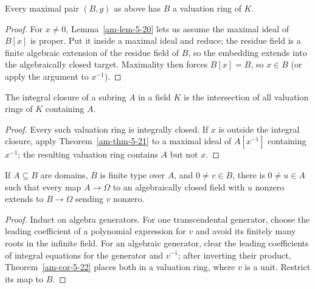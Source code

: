 \begin{theorem}
\label{am-thm-5-21}
\uses{}
Every maximal pair $(B,g)$ as above has $B$ a valuation ring of $K$.
\end{theorem}
\begin{proof}
For $x\ne0$, Lemma~\ref{am-lem-5-20} lets us assume the maximal ideal of
$B[x]$ is proper.  Put it inside a maximal ideal and reduce; the residue field
is a finite algebraic extension of the residue field of $B$, so the embedding
extends into the algebraically closed target.  Maximality then forces $B[x]=B$,
so $x\in B$ (or apply the argument to $x^{-1}$).
\end{proof}
\begin{corollary}
\label{am-cor-5-22}
\uses{}
The integral closure of a subring $A$ in a field $K$ is the intersection of all
valuation rings of $K$ containing $A$.
\end{corollary}
\begin{proof}
Every such valuation ring is integrally closed.  If $x$ is outside the integral
closure, apply Theorem~\ref{am-thm-5-21} to a maximal ideal of $A[x^{-1}]$
containing $x^{-1}$; the resulting valuation ring contains $A$ but not $x$.
\end{proof}
\begin{proposition}
\label{am-prop-5-23}
\uses{}
If $A\subseteq B$ are domains, $B$ is finite type over $A$, and $0\ne v\in B$,
there is $0\ne u\in A$ such that every map $A\to\Omega$ to an algebraically
closed field with $u$ nonzero extends to $B\to\Omega$ sending $v$ nonzero.
\end{proposition}
\begin{proof}
Induct on algebra generators.  For one transcendental generator, choose the
leading coefficient of a polynomial expression for $v$ and avoid its finitely
many roots in the infinite field.  For an algebraic generator, clear the
leading coefficients of integral equations for the generator and $v^{-1}$;
after inverting their product, Theorem~\ref{am-cor-5-22} places both in a
valuation ring, where $v$ is a unit.  Restrict its map to $B$.
\end{proof}
